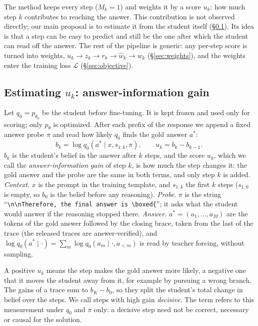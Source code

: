 The method keeps every step ($M_k=1$) and weights it by a score $u_k$: how much step $k$ contributes to reaching the answer.
This contribution is not observed directly; our main proposal is to estimate it from the student itself (\S\ref{sec:gain}).
Its idea is that a step can be easy to predict and still be the one after which the student can read off the answer.
The rest of the pipeline is generic: any per-step score is turned into weights, $u_k\to z_k\to r_k\to\hat w_k\to w_k$ (\S\ref{sec:weights}), and the weights enter the training loss $\mathcal{L}$ (\S\ref{sec:objective}).

\subsection{Estimating $u_k$: answer-information gain}
\label{sec:gain}

Let $q_0=p_{\theta_0}$ be the student before fine-tuning.
It is kept frozen and used only for scoring; only $p_\theta$ is optimized.
After each prefix of the response we append a fixed answer probe $\pi$ and read how likely $q_0$ finds the gold answer $a^*$:
\begin{equation}
  b_k=\log q_0(a^*\mid x,s_{1:k},\pi),\qquad u_k=b_k-b_{k-1}.
  \label{eq:gain}
\end{equation}
$b_k$ is the student's belief in the answer after $k$ steps, and the score $u_k$, which we call the \emph{answer-information gain} of step $k$, is how much the step changes it: the gold answer and the probe are the same in both terms, and only step $k$ is added.
\emph{Context.} $x$ is the prompt in the training template, and $s_{1:k}$ the first $k$ steps ($s_{1:0}$ is empty, so $b_0$ is the belief before any reasoning).
\emph{Probe.} $\pi$ is the string ``\texttt{\textbackslash n\textbackslash nTherefore, the final answer is \textbackslash boxed\{}''; it asks what the student would answer if the reasoning stopped there.
\emph{Answer.} $a^*=(a_1,\dots,a_M)$ are the tokens of the gold answer followed by the closing brace, taken from the last \boxedtok{} of the trace (the released traces are answer-verified), and $\log q_0(a^*\mid\cdot)=\sum_m\log q_0(a_m\mid\cdot,a_{<m})$ is read by teacher forcing, without sampling.

A positive $u_k$ means the step makes the gold answer more likely, a negative one that it moves the student away from it, for example by pursuing a wrong branch.
The gains of a trace sum to $b_K-b_0$, so they split the student's total change in belief over the steps.
We call steps with high gain \emph{decisive}.
The term refers to this measurement under $q_0$ and $\pi$ only: a decisive step need not be correct, necessary or causal for the solution.

